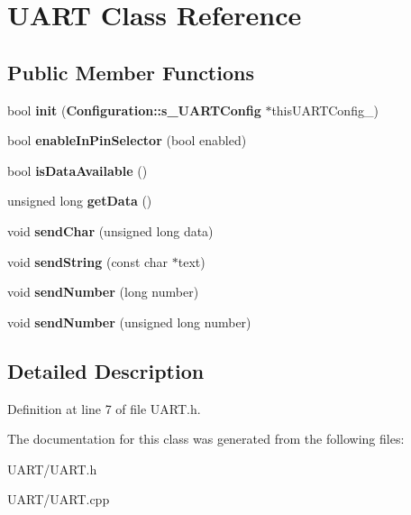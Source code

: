 \section{U\+A\+R\+T Class Reference}
\label{class_u_a_r_t}
\subsection*{Public Member Functions}
\begin{DoxyCompactItemize}
\item 
bool {\bfseries init} ({\bf Configuration\+::s\+\_\+\+U\+A\+R\+T\+Config} $\ast$this\+U\+A\+R\+T\+Config\+\_\+)\label{class_u_a_r_t_ae45344b2f7e91e8ae2f98064d1569ff6}

\item 
bool {\bfseries enable\+In\+Pin\+Selector} (bool enabled)\label{class_u_a_r_t_a7be639b205c00f3e7862071a398a375a}

\item 
bool {\bfseries is\+Data\+Available} ()\label{class_u_a_r_t_a03bca9a23698887520c6463331615e4c}

\item 
unsigned long {\bfseries get\+Data} ()\label{class_u_a_r_t_a26f2bdeec14d7f1eab331bc3441c750c}

\item 
void {\bfseries send\+Char} (unsigned long data)\label{class_u_a_r_t_a206c5e9c54a979277ded03348f26ae57}

\item 
void {\bfseries send\+String} (const char $\ast$text)\label{class_u_a_r_t_a0a993a7203b992640aeb5140838265be}

\item 
void {\bfseries send\+Number} (long number)\label{class_u_a_r_t_a1250cd7fa35229643b117dc635fc4f31}

\item 
void {\bfseries send\+Number} (unsigned long number)\label{class_u_a_r_t_a558de9f26b395a24cc8dccfdba507f99}

\end{DoxyCompactItemize}


\subsection{Detailed Description}


Definition at line 7 of file U\+A\+R\+T.\+h.



The documentation for this class was generated from the following files\+:\begin{DoxyCompactItemize}
\item 
U\+A\+R\+T/U\+A\+R\+T.\+h\item 
U\+A\+R\+T/U\+A\+R\+T.\+cpp\end{DoxyCompactItemize}
